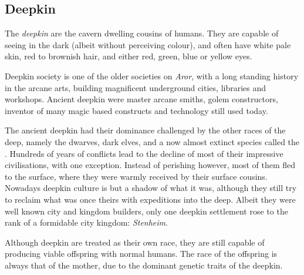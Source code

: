 \subsection{Deepkin}
\label{sec:Deepkin}



The \emph{deepkin} are the cavern dwelling cousins of humans. They are capable
of seeing in the dark (albeit without perceiving colour), and often have white
pale skin, red to brownish hair, and either red, green, blue or yellow eyes.

Deepkin society is one of the older societies on \emph{Aror}, with a long
standing history in the arcane arts, building magnificent underground cities,
libraries and workshops. Ancient deepkin were master arcane smiths, golem
constructors, inventor of many magic based constructs and technology still
used today.

The ancient deepkin had their dominance challenged by the other races of the
deep, namely the dwarves, dark elves, and a now almost extinct species called
the . Hundreds of years of conflicts lead to the decline
of most of their impressive civilisations, with one exception. Instead of
perishing however, most of them fled to the surface, where they were warmly
received by their surface cousins. Nowadays deepkin culture is but a shadow of
what it was, although they still try to reclaim what was once theirs with
expeditions into the deep. Albeit they were well known city and kingdom
builders, only one deepkin settlement rose to the rank of a formidable city
kingdom: \emph{Stenheim}.

Although deepkin are treated as their own race, they are still capable of
producing viable offspring with normal humans. The race of the offspring is
always that of the mother, due to the dominant genetic traits of the deepkin.

